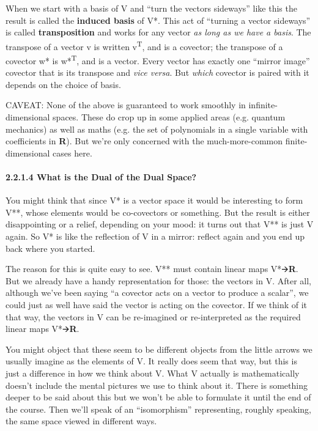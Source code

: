 \documentclass[oneside,english]{amsbook}
\numberwithin{section}{chapter}
\theoremstyle{plain}
\theoremstyle{definition}
\begin{document}
When we start with a basis of V and ``turn the vectors sideways'' like
this the result is called the \textbf{induced basis} of V*. This act of
``turning a vector sideways'' is called \textbf{transposition} and works
for any vector \emph{as long as we have a basis}. The transpose of a
vector v is written v\textsuperscript{T}, and is a covector; the
transpose of a covector w* is w*\textsuperscript{T}, and is a vector.
Every vector has exactly one ``mirror image'' covector that is its
transpose and \emph{vice versa}. But \emph{which} covector is paired
with it depends on the choice of basis.

CAVEAT: None of the above is guaranteed to work smoothly in
infinite-dimensional spaces. These do crop up in some applied areas
(e.g. quantum mechanics) as well as maths (e.g. the set of polynomials
in a single variable with coefficients in \textbf{R}). But we're only
concerned with the much-more-common finite-dimensional cases here.

\paragraph{2.2.1.4 What is the Dual of the Dual
	Space?}\label{what-is-the-dual-of-the-dual-space}

You might think that since V* is a vector space it would be interesting
to form V**, whose elements would be co-covectors or something. But the
result is either disappointing or a relief, depending on your mood: it
turns out that V** is just V again. So V* is like the reflection of V in
a mirror: reflect again and you end up back where you started.

The reason for this is quite easy to see. V** must contain linear maps
V*🡪\textbf{R}. But we already have a handy representation for those: the
vectors in V. After all, although we've been saying ``a covector acts on
a vector to produce a scalar'', we could just as well have said the
vector is acting on the covector. If we think of it that way, the
vectors in V can be re-imagined or re-interpreted as the required linear
maps V*🡪\textbf{R}.

You might object that these seem to be different objects from the little
arrows we usually imagine as the elements of V. It really does seem that
way, but this is just a difference in how we think about V. What V
actually is mathematically doesn't include the mental pictures we use to
think about it. There is something deeper to be said about this but we
won't be able to formulate it until the end of the course. Then we'll
speak of an ``isomorphism'' representing, roughly speaking, the same
space viewed in different ways.
\end{document}
